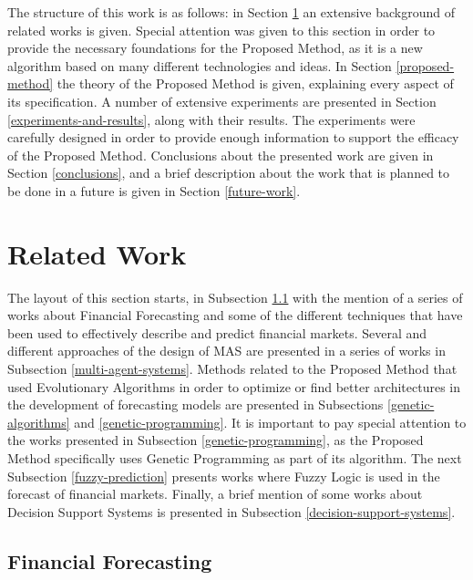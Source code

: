 \documentclass[12pt,journal,draftcls,onecolumn]{IEEEtran}
\begin{document}
The structure of this work is as follows: in Section \ref{related-work} an extensive background of related works is given. Special attention was given to this section in order to provide the necessary foundations for the Proposed Method, as it is a new algorithm based on many different technologies and ideas. In Section \ref{proposed-method} the theory of the Proposed Method is given, explaining every aspect of its specification. A number of extensive experiments are presented in Section \ref{experiments-and-results}, along with their results. The experiments were carefully designed in order to provide enough information to support the efficacy of the Proposed Method. Conclusions about the presented work are given in Section \ref{conclusions}, and a brief description about the work that is planned to be done in a future is given in Section \ref{future-work}.
  

\section{Related Work}
\label{related-work}

The layout of this section starts, in Subsection \ref{financial-forecasting} with the mention of a series of works about Financial Forecasting and some of the different techniques that have been used to effectively describe and predict financial markets. Several and different approaches of the design of MAS are presented in a series of works in Subsection \ref{multi-agent-systems}. Methods related to the Proposed Method that used Evolutionary Algorithms in order to optimize or find better architectures in the development of forecasting models are presented in Subsections \ref{genetic-algorithms} and \ref{genetic-programming}. It is important to pay special attention to the works presented in Subsection \ref{genetic-programming}, as the Proposed Method specifically uses Genetic Programming as part of its algorithm. The next Subsection \ref{fuzzy-prediction} presents works where Fuzzy Logic is used in the forecast of financial markets. Finally, a brief mention of some works about Decision Support Systems is presented in Subsection \ref{decision-support-systems}.

\subsection{Financial Forecasting}
\label{financial-forecasting}

\end{document}
